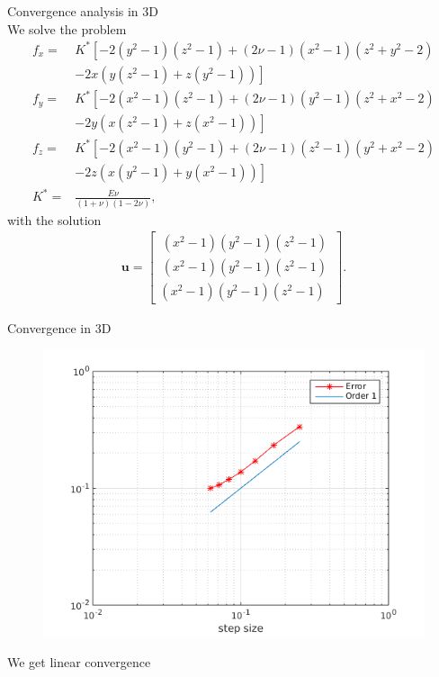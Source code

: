 \documentclass[screen]{beamer}
\begin{document}
\begin{frame}
Convergence analysis in 3D \\

\tiny
We solve the problem
\begin{align*}
f_x = &K^* \left[-2(y^2-1)(z^2-1) + (2 \nu -1)(x^2-1)(z^2 +y^2-2) \right.\nonumber\\
 &\left. -2x(y(z^2-1) + z(y^2-1)) \right] \\
 f_y = &K^* \left[-2(x^2-1)(z^2-1) + (2 \nu -1)(y^2-1)(z^2 +x^2-2) \right.\nonumber\\
 &\left. -2y(x(z^2-1) + z(x^2-1)) \right] \\
 f_z = &K^* \left[-2(x^2-1)(y^2-1) + (2 \nu -1)(z^2-1)(y^2 +x^2-2) \right.\nonumber\\
 &\left. -2z(x(y^2-1) + y(x^2-1)) \right] \\
 K^* = & \frac{E \nu}{(1+\nu)(1-2\nu)},
\end{align*}
with the solution
\begin{align*}
\bm{u} = \begin{bmatrix}
\, (x^2-1)(y^2-1)(z^2-1) \, \\
\, (x^2-1)(y^2-1)(z^2-1) \, \\
(x^2-1)(y^2-1)(z^2-1)
\end{bmatrix}.
\end{align*}
\end{frame}

\begin{frame}
Convergence in 3D
\begin{figure}
  		\includegraphics[scale=0.45]{figures/convergence3d}
\end{figure}
We get linear convergence
\end{frame}
\end{document}
